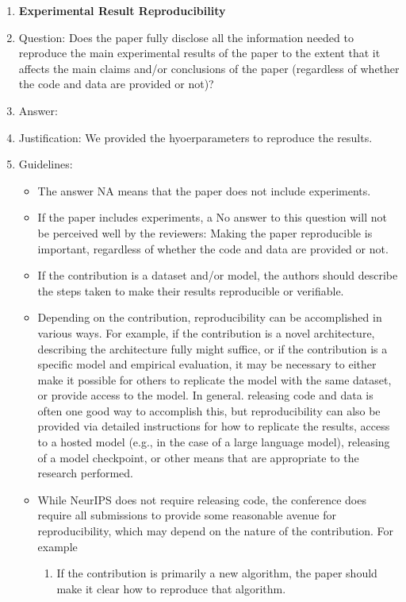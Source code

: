 \documentclass{article}
\begin{document}
\begin{enumerate}
    \item {\bf Experimental Result Reproducibility}
    \item[] Question: Does the paper fully disclose all the information needed to reproduce the main experimental results of the paper to the extent that it affects the main claims and/or conclusions of the paper (regardless of whether the code and data are provided or not)?
    \item[] Answer: \answerYes{} %
    \item[] Justification: We provided the hyoerparameters to reproduce the results.
    \item[] Guidelines:
    \begin{itemize}
        \item The answer NA means that the paper does not include experiments.
        \item If the paper includes experiments, a No answer to this question will not be perceived well by the reviewers: Making the paper reproducible is important, regardless of whether the code and data are provided or not.
        \item If the contribution is a dataset and/or model, the authors should describe the steps taken to make their results reproducible or verifiable. 
        \item Depending on the contribution, reproducibility can be accomplished in various ways. For example, if the contribution is a novel architecture, describing the architecture fully might suffice, or if the contribution is a specific model and empirical evaluation, it may be necessary to either make it possible for others to replicate the model with the same dataset, or provide access to the model. In general. releasing code and data is often one good way to accomplish this, but reproducibility can also be provided via detailed instructions for how to replicate the results, access to a hosted model (e.g., in the case of a large language model), releasing of a model checkpoint, or other means that are appropriate to the research performed.
        \item While NeurIPS does not require releasing code, the conference does require all submissions to provide some reasonable avenue for reproducibility, which may depend on the nature of the contribution. For example
        \begin{enumerate}
            \item If the contribution is primarily a new algorithm, the paper should make it clear how to reproduce that algorithm.

\end{enumerate}
\end{itemize}
\end{enumerate}
\end{document}
